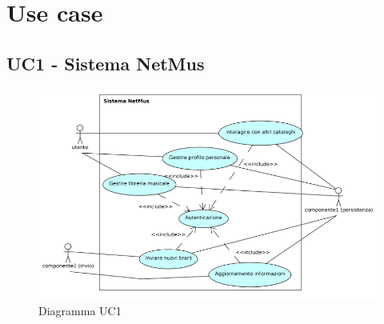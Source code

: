 \chapter{Use case}
\thispagestyle{fancy}

\section{UC1 - Sistema NetMus}

\begin{figure}[h]
  \centering
  \includegraphics[width=18cm]{img/AR/UC1.png}
\caption{Diagramma UC1}
\end{figure}

